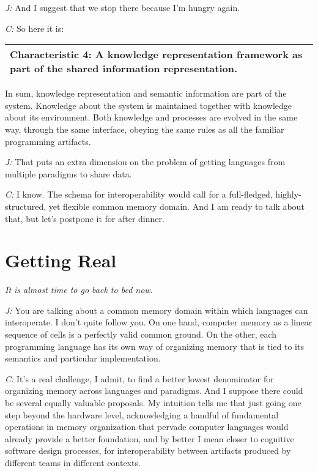 \documentclass[10pt]{sigplanconf}
\begin{document}
\emph{J:} And I suggest that we stop there because I'm hungry again.


\emph{C:} So here it is:

\bigskip

\begin{tabular}{|p{7cm}|}
\hline
\textbf{Characteristic 4: A knowledge representation framework as part of the shared information representation. }
\\
\hline
\end{tabular}

\bigskip

In sum, knowledge representation and semantic information are part of the system. Knowledge about the system is maintained together with knowledge about its environment. Both knowledge and processes are evolved in the same way, through the same interface, obeying the same rules as all the familiar programming artifacts.

\emph{J:} That puts an extra dimension on the problem of getting languages from multiple paradigms to share data.

\emph{C:} I know. The schema for interoperability would call for a full-fledged, highly-structured, yet flexible common memory domain. And I am ready to talk about that, but let's postpone it for after dinner.

\section{Getting Real}

\emph{It is almost time to go back to bed now.}

\emph{J:} You are talking about a common memory domain within which languages can interoperate. I don't quite follow you. On one hand, computer memory as a linear sequence of cells is a perfectly valid common ground. On the other, each programming language has its own way of organizing memory that is tied to its semantics and particular implementation. 

\emph{C:} It's a real challenge, I admit, to find a better lowest denominator for organizing memory across languages and paradigms. And I suppose there could be several equally valuable proposals. My intuition tells me that just going one step beyond the hardware level, acknowledging a handful of fundamental operations in memory organization that pervade computer languages would already provide a better foundation, and by better I mean closer to cognitive software design processes, for interoperability between artifacts produced by different teams in different contexts.
\end{document}
